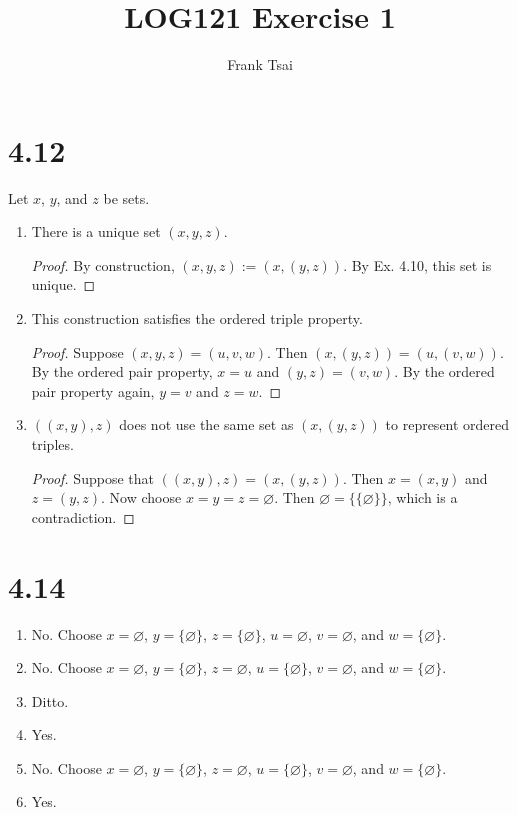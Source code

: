 \documentclass[a4paper]{article}
\title{LOG121 Exercise 1}
\author{Frank Tsai}
\begin{document}
\maketitle

\section{4.12}
Let $x$, $y$, and $z$ be sets.
\begin{enumerate}
\item There is a unique set $(x,y,z)$.
  \begin{proof}
    By construction, $(x,y,z) := (x,(y,z))$.
    By Ex. 4.10, this set is unique. \qedhere
  \end{proof}
\item This construction satisfies the ordered triple property.
  \begin{proof}
    Suppose $(x,y,z) = (u,v,w)$.
    Then $(x,(y,z)) = (u,(v,w))$.
    By the ordered pair property, $x = u$ and $(y,z) = (v,w)$.
    By the ordered pair property again, $y = v$ and $z = w$.
  \end{proof}
\item $((x,y),z)$ does not use the same set as $(x,(y,z))$ to represent ordered triples.
  \begin{proof}
    Suppose that $((x,y),z) = (x,(y,z))$.
    Then $x = (x,y)$ and $z = (y,z)$.
    Now choose $x = y = z = \varnothing$.
    Then $\varnothing = \{\{\varnothing\}\}$, which is a contradiction.
  \end{proof}
\end{enumerate}

\section{4.14}
\begin{enumerate}
\item No. Choose $x = \varnothing$, $y = \{\varnothing\}$, $z = \{\varnothing\}$, $u = \varnothing$, $v = \varnothing$, and $w = \{\varnothing\}$.
\item No. Choose $x = \varnothing$, $y = \{\varnothing\}$, $z = \varnothing$, $u = \{\varnothing\}$, $v = \varnothing$, and $w = \{\varnothing\}$.
\item Ditto.
\item Yes.
\item No. Choose $x = \varnothing$, $y = \{\varnothing\}$, $z = \varnothing$, $u = \{\varnothing\}$, $v = \varnothing$, and $w = \{\varnothing\}$.
\item Yes.
\end{enumerate}

\end{document}
